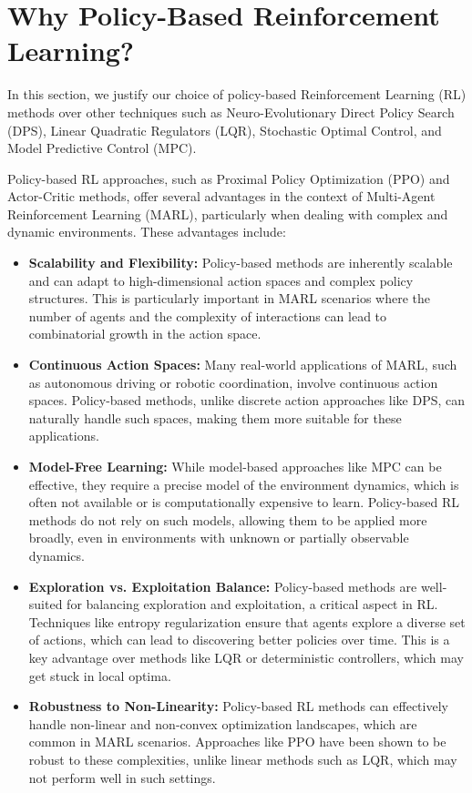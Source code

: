 \documentclass[sigconf,anonymous]{aamas}
\begin{document}
\section{Why Policy-Based Reinforcement Learning?}

In this section, we justify our choice of policy-based Reinforcement Learning (RL) methods over other techniques such as Neuro-Evolutionary Direct Policy Search (DPS), Linear Quadratic Regulators (LQR), Stochastic Optimal Control, and Model Predictive Control (MPC). 

Policy-based RL approaches, such as Proximal Policy Optimization (PPO) and Actor-Critic methods, offer several advantages in the context of Multi-Agent Reinforcement Learning (MARL), particularly when dealing with complex and dynamic environments. These advantages include:

\begin{itemize}
    \item \textbf{Scalability and Flexibility:} Policy-based methods are inherently scalable and can adapt to high-dimensional action spaces and complex policy structures. This is particularly important in MARL scenarios where the number of agents and the complexity of interactions can lead to combinatorial growth in the action space.
    \item \textbf{Continuous Action Spaces:} Many real-world applications of MARL, such as autonomous driving or robotic coordination, involve continuous action spaces. Policy-based methods, unlike discrete action approaches like DPS, can naturally handle such spaces, making them more suitable for these applications.
    \item \textbf{Model-Free Learning:} While model-based approaches like MPC can be effective, they require a precise model of the environment dynamics, which is often not available or is computationally expensive to learn. Policy-based RL methods do not rely on such models, allowing them to be applied more broadly, even in environments with unknown or partially observable dynamics.
    \item \textbf{Exploration vs. Exploitation Balance:} Policy-based methods are well-suited for balancing exploration and exploitation, a critical aspect in RL. Techniques like entropy regularization ensure that agents explore a diverse set of actions, which can lead to discovering better policies over time. This is a key advantage over methods like LQR or deterministic controllers, which may get stuck in local optima.
    \item \textbf{Robustness to Non-Linearity:} Policy-based RL methods can effectively handle non-linear and non-convex optimization landscapes, which are common in MARL scenarios. Approaches like PPO have been shown to be robust to these complexities, unlike linear methods such as LQR, which may not perform well in such settings.
\end{itemize}
\end{document}

